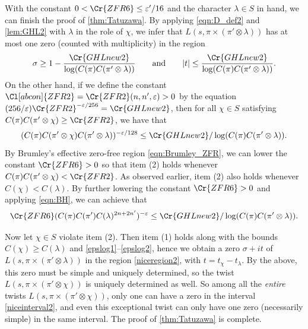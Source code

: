 \documentclass[12pt]{amsart}
\theoremstyle{definition}
\theoremstyle{remark}
\numberwithin{equation}{section}
\theoremstyle{plain}
\renewcommand{\epsilon}{\varepsilon}
\begin{document}
With the constant $0<\Cr{ZFR6}\leq\epsilon'/16$ and the character $\lambda\in S$ in hand, we can finish the proof of \cref{thm:Tatuzawa}. By applying \eqref{eqn:D_def2} and \cref{lem:GHL2} with $\lambda$ in the role of $\chi$, we infer that $L(s,\pi\times(\pi'\otimes\lambda))$ has at most one zero (counted with multiplicity) in the region
\begin{equation}
\label{niceregion2}
\sigma\geq 1-\frac{\Cr{GHLnew2}}{\log(C(\pi)C(\pi'\otimes\lambda))}
\qquad\text{and}\qquad
|t|\leq\frac{\Cr{GHLnew2}}{\log(C(\pi)C(\pi'\otimes\lambda))}.
\end{equation}
On the other hand, if we define the constant $\Cl[abcon]{ZFR2}=\Cr{ZFR2}(n,n',\epsilon)>0$ by the equation 
$(256/\epsilon)\Cr{ZFR2}^{-\epsilon/256}=\Cr{GHLnew2}$, then for all $\chi\in S$ satisfying $C(\pi)C(\pi'\otimes\chi)\geq\Cr{ZFR2}$, we have that
\begin{equation}
\label{epslog1}
(C(\pi)C(\pi'\otimes\chi)C(\pi'\otimes\lambda))^{-\epsilon/128}\leq\Cr{GHLnew2}/\log(C(\pi)C(\pi'\otimes\lambda)).
\end{equation}
By Brumley's effective zero-free region \eqref{eqn:Brumley_ZFR}, we can lower the constant $\Cr{ZFR6}>0$ so that item (2) holds whenever $C(\pi)C(\pi'\otimes\chi)<\Cr{ZFR2}$. As observed earlier, item (2) also holds whenever $C(\chi)<C(\lambda)$. By further lowering the constant $\Cr{ZFR6}>0$ and applying \eqref{eqn:BH}, we can achieve that
\begin{equation}
\label{epslog2}
\Cr{ZFR6}(C(\pi)C(\pi')C(\lambda)^{2n+2n'})^{-\epsilon}\leq\Cr{GHLnew2}/\log(C(\pi)C(\pi'\otimes\lambda)).
\end{equation}

Now let $\chi\in S$ violate item (2). Then item (1) holds along with the bounds $C(\chi)\geq C(\lambda)$ and
\eqref{epslog1}--\eqref{epslog2}, hence we obtain a zero $\sigma+it$ of $L(s,\pi\times(\pi'\otimes\lambda))$ in the region \eqref{niceregion2}, with $t=t_\chi-t_\lambda$. By the above, this zero must be simple and uniquely determined, so the twist $L(s,\pi\times(\pi'\otimes\chi))$ is uniquely determined as well. So among all the \emph{entire} twists $L(s,\pi\times(\pi'\otimes\chi))$, only one can have a zero in the interval \eqref{niceinterval2}, and even this exceptional twist can only have one zero (necessarily simple) in the same interval.
The proof of \cref{thm:Tatuzawa} is complete.



\end{document}
